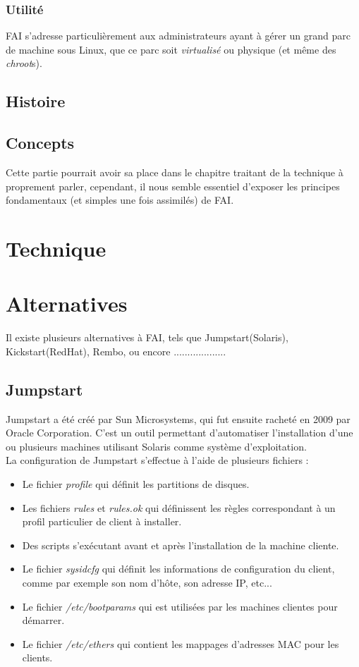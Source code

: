 \documentclass[a4paper,12pt,one side,titlepage]{report}
\begin{document}
\subsection{Utilité}
\textsc{FAI} s'adresse particulièrement aux administrateurs ayant à gérer un grand parc de machine sous Linux, que ce parc soit \textit{virtualisé} ou physique (et même des \textit{chroot}s).

\section{Histoire}


\section{Concepts}
Cette partie pourrait avoir sa place dans le chapitre traitant de la technique à proprement parler, cependant, il nous semble essentiel d'exposer les principes fondamentaux (et simples une fois assimilés) de \textsc{FAI}.



\chapter{Technique}

\chapter{Alternatives}
Il existe plusieurs alternatives à FAI, tels que Jumpstart(Solaris), Kickstart(RedHat), Rembo, ou encore ...................

\section{Jumpstart}
Jumpstart a été créé par Sun Microsystems, qui fut ensuite racheté en 2009 par Oracle Corporation. C'est un outil permettant d'automatiser l'installation d'une ou plusieurs machines utilisant Solaris comme système d'exploitation.\\
La configuration de Jumpstart s'effectue à l'aide de plusieurs fichiers :\\
\begin{itemize}
  \item Le fichier \textit{profile} qui définit les partitions de disques.
  \item Les fichiers \textit{rules} et \textit{rules.ok} qui définissent les règles correspondant à un profil particulier de client à installer.
  \item Des scripts s'exécutant avant et après l'installation de la machine cliente.
  \item Le fichier \textit{sysidcfg} qui définit les informations de configuration du client, comme par exemple son nom d'hôte, son adresse IP, etc...
  \item Le fichier \textit{/etc/bootparams} qui est utilisées par les machines clientes pour démarrer.
  \item Le fichier \textit{/etc/ethers} qui contient les mappages d'adresses MAC pour les clients.\\
\end{itemize}
\end{document}
